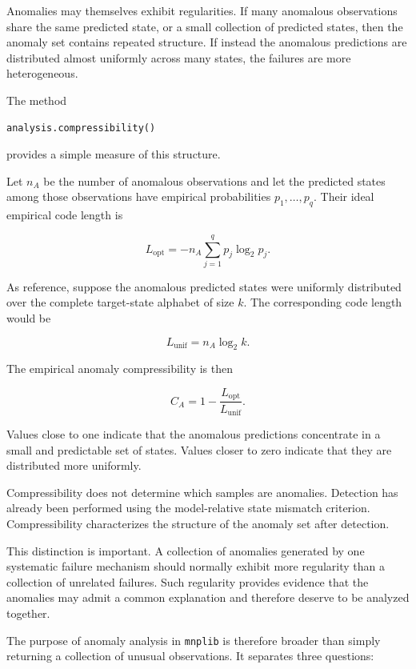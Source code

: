 Anomalies may themselves exhibit regularities. If many anomalous observations
share the same predicted state, or a small collection of predicted states, then
the anomaly set contains repeated structure. If instead the anomalous
predictions are distributed almost uniformly across many states, the failures
are more heterogeneous.

The method

\begin{sourcecode}
{\scriptsize
\begin{verbatim}
analysis.compressibility()
\end{verbatim}}
\end{sourcecode}

provides a simple measure of this structure.

Let \(n_A\) be the number of anomalous observations and let the predicted
states among those observations have empirical probabilities
\(p_1,\ldots,p_q\). Their ideal empirical code length is

\[
L_{\mathrm{opt}}
=
-n_A
\sum_{j=1}^{q}
p_j\log_2 p_j.
\]

As reference, suppose the anomalous predicted states were uniformly distributed
over the complete target-state alphabet of size \(k\). The corresponding code
length would be

\[
L_{\mathrm{unif}}
=
n_A\log_2 k.
\]

The empirical anomaly compressibility is then

\[
C_A
=
1-
\frac{L_{\mathrm{opt}}}
     {L_{\mathrm{unif}}}.
\]

Values close to one indicate that the anomalous predictions concentrate in a
small and predictable set of states. Values closer to zero indicate that they
are distributed more uniformly.

Compressibility does not determine which samples are anomalies. Detection has
already been performed using the model-relative state mismatch criterion.
Compressibility characterizes the structure of the anomaly set after detection.

This distinction is important. A collection of anomalies generated by one
systematic failure mechanism should normally exhibit more regularity than a
collection of unrelated failures. Such regularity provides evidence that the
anomalies may admit a common explanation and therefore deserve to be analyzed
together.

The purpose of anomaly analysis in \texttt{mnplib} is therefore broader than
simply returning a collection of unusual observations. It separates three
questions:

